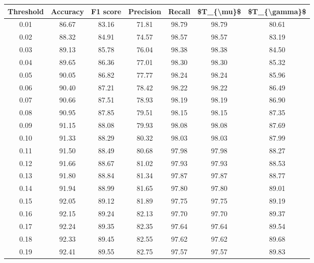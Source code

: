 \begin{tabular}{|c|c|c|c|c|c|c|}
\hline
 Threshold &  Accuracy &  F1 score &  Precision &  Recall &  \$T\_\{\textbackslash mu\}\$ &  \$T\_\{\textbackslash gamma\}\$ \\
\hline
      0.01 &     86.67 &     83.16 &      71.81 &   98.79 &      98.79 &         80.61 \\
      0.02 &     88.32 &     84.91 &      74.57 &   98.57 &      98.57 &         83.19 \\
      0.03 &     89.13 &     85.78 &      76.04 &   98.38 &      98.38 &         84.50 \\
      0.04 &     89.65 &     86.36 &      77.01 &   98.30 &      98.30 &         85.32 \\
      0.05 &     90.05 &     86.82 &      77.77 &   98.24 &      98.24 &         85.96 \\
      0.06 &     90.40 &     87.21 &      78.42 &   98.22 &      98.22 &         86.49 \\
      0.07 &     90.66 &     87.51 &      78.93 &   98.19 &      98.19 &         86.90 \\
      0.08 &     90.95 &     87.85 &      79.51 &   98.15 &      98.15 &         87.35 \\
      0.09 &     91.15 &     88.08 &      79.93 &   98.08 &      98.08 &         87.69 \\
      0.10 &     91.33 &     88.29 &      80.32 &   98.03 &      98.03 &         87.99 \\
      0.11 &     91.50 &     88.49 &      80.68 &   97.98 &      97.98 &         88.27 \\
      0.12 &     91.66 &     88.67 &      81.02 &   97.93 &      97.93 &         88.53 \\
      0.13 &     91.80 &     88.84 &      81.34 &   97.87 &      97.87 &         88.77 \\
      0.14 &     91.94 &     88.99 &      81.65 &   97.80 &      97.80 &         89.01 \\
      0.15 &     92.05 &     89.12 &      81.89 &   97.75 &      97.75 &         89.19 \\
      0.16 &     92.15 &     89.24 &      82.13 &   97.70 &      97.70 &         89.37 \\
      0.17 &     92.24 &     89.35 &      82.35 &   97.64 &      97.64 &         89.54 \\
      0.18 &     92.33 &     89.45 &      82.55 &   97.62 &      97.62 &         89.68 \\
      0.19 &     92.41 &     89.55 &      82.75 &   97.57 &      97.57 &         89.83 \\

\end{tabular}
